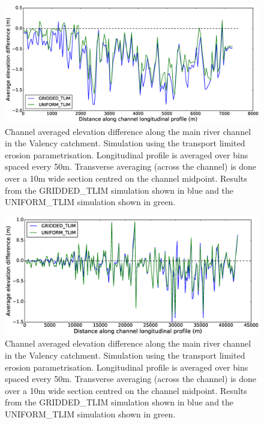 \begin{figure}[htb]
\includegraphics[width=14cm]{chp06_figures_scripts/fig_swath_profile_boscastle_erode_tlim.eps}
\caption{Channel averaged elevation difference along the main river channel in the Valency catchment. Simulation using the transport limited erosion parametrisation. Longitudinal profile is averaged over bins spaced every 50m. Transverse averaging (across the channel) is done over a 10m wide section centred on the channel midpoint. Results from the GRIDDED\_TLIM simulation shown in blue and the UNIFORM\_TLIM simulation shown in green.}
\label{fig_boscastle_swath_tlim}
\end{figure}

\begin{figure}[htb]
\includegraphics[width=14cm]{chp06_figures_scripts/fig_swath_profile_ryedale_erode_tlim.eps}
\caption{Channel averaged elevation difference along the main river channel in the Valency catchment. Simulation using the transport limited erosion parametrisation. Longitudinal profile is averaged over bins spaced every 50m. Transverse averaging (across the channel) is done over a 10m wide section centred on the channel midpoint. Results from the GRIDDED\_TLIM simulation shown in blue and the UNIFORM\_TLIM simulation shown in green.}
\label{fig_ryedale_swath_tlim}
\end{figure}

